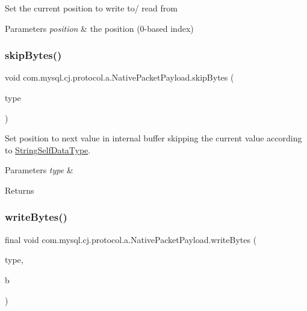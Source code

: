 Set the current position to write to/ read from


\begin{DoxyParams}{Parameters}
{\em position} & the position (0-\/based index) \\
\hline
\end{DoxyParams}
\mbox{\label{classcom_1_1mysql_1_1cj_1_1protocol_1_1a_1_1_native_packet_payload_afea96a6e9c4a2fc5e4faf2582a0899b1}} 
\subsubsection{\texorpdfstring{skip\+Bytes()}{skipBytes()}}
{\footnotesize\ttfamily void com.\+mysql.\+cj.\+protocol.\+a.\+Native\+Packet\+Payload.\+skip\+Bytes (\begin{DoxyParamCaption}\item[{String\+Self\+Data\+Type}]{type }\end{DoxyParamCaption})}

Set position to next value in internal buffer skipping the current value according to \mbox{\hyperlink{}{String\+Self\+Data\+Type}}.


\begin{DoxyParams}{Parameters}
{\em type} & \\
\hline
\end{DoxyParams}
\begin{DoxyReturn}{Returns}

\end{DoxyReturn}
\mbox{\label{classcom_1_1mysql_1_1cj_1_1protocol_1_1a_1_1_native_packet_payload_add0512948b6c89c36d0e88b75666e181}} 
\subsubsection{\texorpdfstring{write\+Bytes()}{writeBytes()}\hspace{0.1cm}{\footnotesize\ttfamily [1/4]}}
{\footnotesize\ttfamily final void com.\+mysql.\+cj.\+protocol.\+a.\+Native\+Packet\+Payload.\+write\+Bytes (\begin{DoxyParamCaption}\item[{String\+Self\+Data\+Type}]{type,  }\item[{byte \mbox{[}$\,$\mbox{]}}]{b }\end{DoxyParamCaption})}

